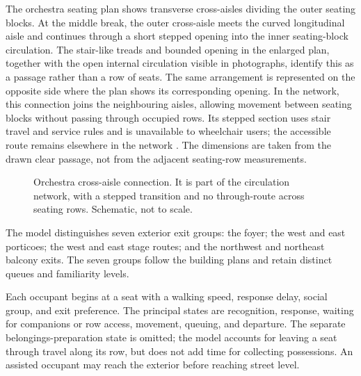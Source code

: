 \documentclass[11pt,a4paper]{article}
\begin{document}
The orchestra seating plan shows transverse cross-aisles dividing the outer seating blocks. At the middle break, the outer cross-aisle meets the curved longitudinal aisle and continues through a short stepped opening into the inner seating-block circulation. The stair-like treads and bounded opening in the enlarged plan, together with the open internal circulation visible in photographs, identify this as a passage rather than a row of seats. The same arrangement is represented on the opposite side where the plan shows its corresponding opening. In the network, this connection joins the neighbouring aisles, allowing movement between seating blocks without passing through occupied rows. Its stepped section uses stair travel and service rules and is unavailable to wheelchair users; the accessible route remains elsewhere in the network \cite{brief}. The dimensions are taken from the drawn clear passage, not from the adjacent seating-row measurements.

\begin{figure}[htbp]
\centering
{}
\caption{Orchestra cross-aisle connection. It is part of the circulation network, with a stepped transition and no through-route across seating rows. Schematic, not to scale.}
\label{fig:crossaisle}
\end{figure}

The model distinguishes seven exterior exit groups: the foyer; the west and east porticoes; the west and east stage routes; and the northwest and northeast balcony exits. The seven groups follow the building plans \cite{brief} and retain distinct queues and familiarity levels.

Each occupant begins at a seat with a walking speed, response delay, social group, and exit preference. The principal states are recognition, response, waiting for companions or row access, movement, queuing, and departure. The separate belongings-preparation state is omitted; the model accounts for leaving a seat through travel along its row, but does not add time for collecting possessions. An assisted occupant may reach the exterior before reaching street level.
\end{document}
